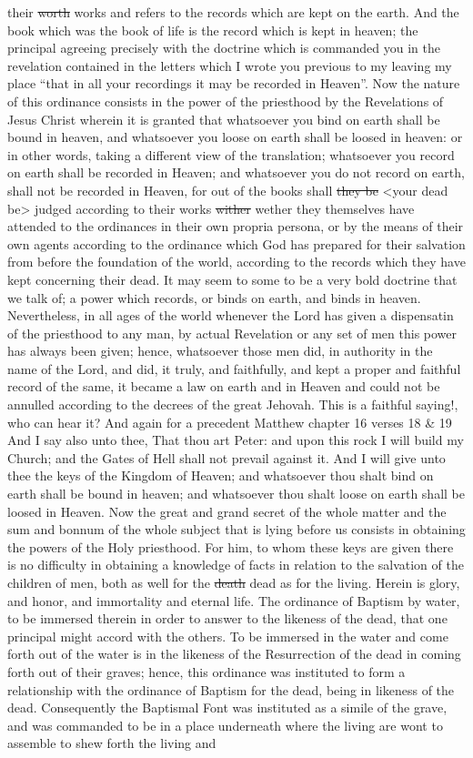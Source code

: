 their \sout{worth} works and refers to the records which are kept on the earth. And the book which was the book of life is the record which is kept in heaven; the principal agreeing precisely with the doctrine which is commanded you in the revelation contained in the letters which I wrote you previous to my leaving my place ``that in all your recordings it may be recorded in Heaven''. Now the nature of this ordinance consists in the power of the priesthood by the Revelations of Jesus Christ wherein it is granted that whatsoever you bind on earth shall be bound in heaven, and whatsoever you loose on earth shall be loosed in heaven: or in other words, taking a different view of the translation; whatsoever you record on earth shall be recorded in Heaven; and whatsoever you do not record on earth, shall not be recorded in Heaven, for out of the books shall \sout{they be} <your dead be> judged according to their works \sout{wither} wether they themselves have attended to the ordinances in their own propria persona, or by the means of their own agents according to the ordinance which God has prepared for their salvation from before the foundation of the world, according to the records which they have kept concerning their dead. It may seem to some to be a very bold doctrine that we talk of; a power which records, or binds on earth, and binds in heaven. Nevertheless, in all ages of the world whenever the Lord has given a dispensatin of the priesthood to any man, by actual Revelation or any set of men this power has always been given; hence, whatsoever those men did, in authority in the name of the Lord, and did, it truly, and faithfully, and kept a proper and faithful record of the same, it became a law on earth and in Heaven and could not be annulled according to the decrees of the great Jehovah. This is a faithful saying!, who can hear it? And again for a precedent Matthew chapter 16 verses 18 \& 19 And I say also unto thee, That thou art Peter: and upon this rock I will build my Church; and the Gates of Hell shall not prevail against it. And I will give unto thee the keys of the Kingdom of Heaven; and whatsoever thou shalt bind on earth shall be bound in heaven; and whatsoever thou shalt loose on earth shall be loosed in Heaven. Now the great and grand secret of the whole matter and the sum and bonnum of the whole subject that is lying before us consists in obtaining the powers of the Holy priesthood. For him, to whom these keys are given there is no difficulty in obtaining a knowledge of facts in relation to the salvation of the children of men, both as well for the \sout{death} dead as for the living. Herein is glory, and honor, and immortality and eternal life. The ordinance of Baptism by water, to be immersed therein in order to answer to the likeness of the dead, that one principal might accord with the others. To be immersed in the water and come forth out of the water is in the likeness of the Resurrection of the dead in coming forth out of their graves; hence, this ordinance was instituted to form a relationship with the ordinance of Baptism for the dead, being in likeness of the dead. Consequently the Baptismal Font was instituted as a simile of the grave, and was commanded to be in a place underneath where the living are wont to assemble to shew forth the living and 